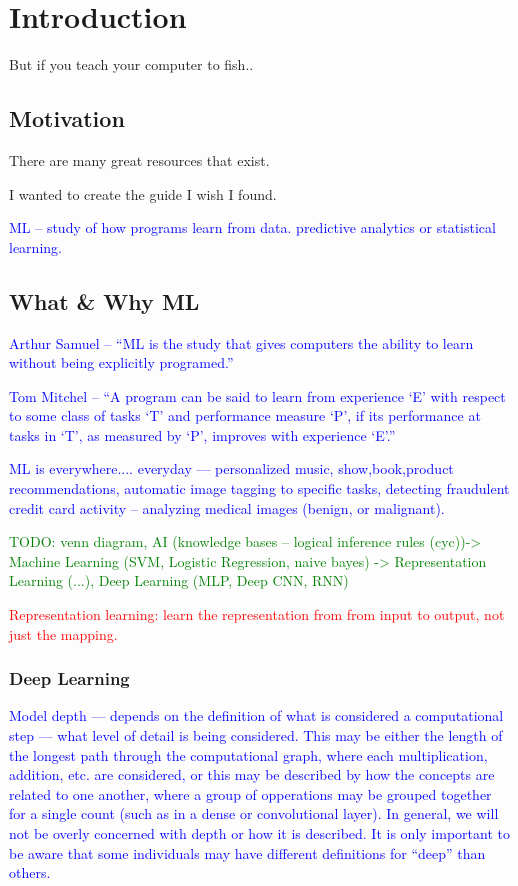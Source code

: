 \chapter{Introduction}

But if you teach your computer to fish..


\section{Motivation}
There are many great resources that exist.

I wanted to create the guide I wish I found.

\textcolor{blue}{ML -- study of how programs learn from data. predictive analytics or statistical learning.}



\section{What \& Why ML}
\textcolor{blue}{Arthur Samuel -- ``ML is the study that gives computers the ability to learn without being explicitly programed.''}

\textcolor{blue}{Tom Mitchel -- ``A program can be said to learn from experience `E' with respect to some class of tasks `T' and performance measure `P', if its performance at tasks in `T', as measured by `P', improves with experience `E'.''}

\textcolor{blue}{ML is everywhere.... everyday --- personalized music, show,book,product recommendations, automatic image tagging to specific tasks, detecting fraudulent credit card activity -- analyzing medical images (benign, or malignant). }

\textcolor{green}{TODO: venn diagram, AI (knowledge bases -- logical inference rules (cyc))-> Machine Learning  (SVM, Logistic Regression, naive bayes) -> Representation Learning (...), Deep Learning (MLP, Deep CNN, RNN)}

\textcolor{red}{Representation learning: learn the representation from from input to output, not just the mapping.}

\subsection{Deep Learning}


\textcolor{blue}{Model depth --- depends on the definition of what is considered a computational step --- what level of detail is being considered. This may be either the length of the longest path through the computational graph, where each multiplication, addition, etc. are considered, or this may be described by how the concepts are related to one another, where a group of opperations may be grouped together for a single count (such as in a dense or convolutional layer). In general, we will not be overly concerned with depth or how it is described. It is only important to be aware that some individuals may have different definitions for ``deep'' than others.}

